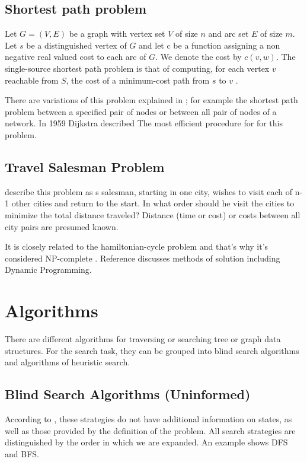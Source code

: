 \documentclass[12pt]{article}
\begin{document}
\subsection{Shortest path problem}
Let $G =  (V, E)$ be a graph with  vertex  set $V$ of size $n$ and arc set $E$ of size $m$. Let $s$ be a distinguished  vertex  of $G$ and let c be a function  assigning a non negative  real valued cost to each arc of $G$. We denote the cost by $c(v,w)$. The single-source shortest path problem is that  of computing, for each vertex  $v$ reachable from  $S$, the cost of a minimum-cost  path  from  $s$ to  $v$ \cite{ahuja1990faster}. 

There are variations of this problem explained in \cite{dreyfus1969appraisal}; for example the shortest path problem between a specified pair of nodes or between all pair of nodes of a network. In 1959 Dijkstra \cite{dijkstra1959note} described The most efficient procedure  for for this problem. 

\subsection{Travel Salesman Problem}
\cite{little1963algorithm} describe this problem as s salesman, starting in one city, wishes to visit each of n-1 other cities and return to the start. In what order should he visit the cities to minimize the total distance traveled? Distance (time or cost) or costs between all city pairs are presumed known.

It is closely related to the hamiltonian-cycle problem and that's why it's considered NP-complete \cite{cormen2009introduction}. Reference \cite{bellmore1968traveling} discusses methods of solution including Dynamic Programming.

\section{Algorithms}
There are different algorithms for traversing or searching tree or graph data structures. For the search task, they can be grouped into blind search algorithms and algorithms of heuristic search.

\subsection{Blind Search Algorithms (Uninformed)}
According to \cite{russell2004inteligencia}, these strategies do not have additional information on states, as well as those provided by the definition of the problem. All search strategies are distinguished by the order in which we are expanded. An example shows DFS and BFS.
\end{document}
